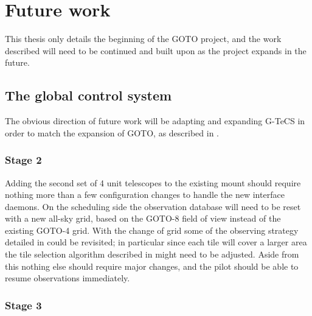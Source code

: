 \section{Future work}
\label{sec:future}
\begin{colsection}


\begin{colsection}

This thesis only details the beginning of the GOTO project, and the work described will need to be continued and built upon as the project expands in the future.

\end{colsection}


\subsection{The global control system}
\label{sec:gtecs_future}
\begin{colsection}

The obvious direction of future work will be adapting and expanding G-TeCS in order to match the expansion of GOTO, as described in .

\subsubsection{Stage 2}

Adding the second set of 4 unit telescopes to the existing mount should require nothing more than a few configuration changes to handle the new interface daemons. On the scheduling side the observation database will need to be reset with a new all-sky grid, based on the GOTO-8 field of view instead of the existing GOTO-4 grid. With the change of grid some of the observing strategy detailed in  could be revisited; in particular since each tile will cover a larger area the tile selection algorithm described in  might need to be adjusted. Aside from this nothing else should require major changes, and the pilot should be able to resume observations immediately.

\subsubsection{Stage 3}


\end{colsection}
\end{colsection}
